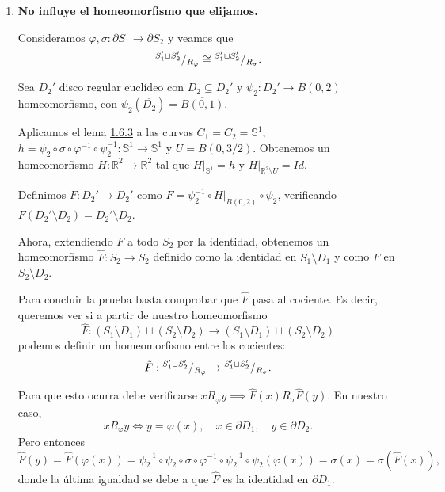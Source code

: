 {\begin{enumerate}
        Sea ahora $\varepsilon > 0 $ suficientemente pequeño de forma que $\overline{F(D_4)} \subseteq D_1$, donde $D_4 = \psi^{-1}(B(0, \varepsilon))$. Como $\overline{D_4} \subseteq D_3$, por el paso 1) obtenemos $S_1 \setminus D_4 \cong S_1 \setminus D_3$, y de la misma forma $S_1 \setminus F(D_4) \cong S_1 \setminus D_1$.

        Pero como $F$ es un homeomorfismo, $S_1 \setminus F(D_4) \cong S_1 \setminus D_4$, concluyendo así el paso 2.

        \item \textbf{No influye el homeomorfismo que elijamos.}

        Consideramos $\varphi,\sigma:\partial S_1\to\partial S_2$ y veamos que
        \[
        {^{S_1'\sqcup S_2'}}/{_{R_\varphi}}\cong{^{S_1'\sqcup S_2'}}/{_{R_\sigma}}.
        \]

        Sea $D_2'$ disco regular euclídeo con $\overline{D_2}\subseteq D_2'$ y $\psi_2 : D_2' \to B(0,2)$ homeomorfismo, con $\psi_2(\overline{D_2}) = \overline{B(0,1)}$. 

        Aplicamos el lema \hyperref[lem:extension-homeo]{1.6.3} a las curvas $C_1 = C_2 = \mathbb{S}^1$, $h = \psi_2 \circ \sigma \circ \varphi^{-1} \circ \psi_2^{-1} : \mathbb{S}^1\to \mathbb{S}^1$ y $U = B(0,3/2)$. Obtenemos un homeomorfismo $H : \mathbb{R}^2 \to \mathbb{R}^2$ tal que $H\vert_{\mathbb{S}^1} = h$ y $H\vert_{\mathbb{R}^2\setminus U} = Id$. 

        Definimos $F:D_2' \to D_2'$ como $F = \psi_2^{-1} \circ H \vert_{B(0,2)} \circ \psi_2$, verificando $F(D_2'\setminus D_2) = D_2'\setminus D_2$. 

        Ahora, extendiendo $F$ a todo $S_2$ por la identidad, obtenemos un homeomorfismo $\hat{F} : S_2 \to S_2$ definido como la identidad en $S_1 \setminus D_1$ y como $F$ en $ S_2 \setminus D_2$.

        Para concluir la prueba basta comprobar que $\hat{F}$ pasa al cociente. Es decir, queremos ver si a partir de nuestro homeomorfismo 
        \[
        \hat{F} : (S_1\setminus D_1)\sqcup(S_2\setminus D_2) \to (S_1\setminus D_1)\sqcup(S_2\setminus D_2)
        \]
        podemos definir un homeomorfismo entre los cocientes:  
        \[
        \tilde{F} : {^{S_1'\sqcup S_2'}}/{_{R_\varphi}} \to {^{S_1'\sqcup S_2'}}/{_{R_\sigma}}.
        \]

        Para que esto ocurra debe verificarse $xR_\varphi y \implies \hat{F}(x) R_\sigma \hat{F}(y)$. En nuestro caso,  
        \[
        xR_\varphi y \iff y = \varphi(x), \quad x\in \partial D_1, \quad y\in \partial D_2. 
        \]
        Pero entonces
        \[
        \hat{F}(y) = \hat{F}(\varphi(x)) = \psi_2^{-1} \circ \psi_2 \circ \sigma \circ \varphi^{-1} \circ \psi_2^{-1} \circ \psi_2(\varphi(x))
        = \sigma(x) = \sigma(\hat{F}(x)),
        \]
        donde la última igualdad se debe a que $\hat{F}$ es la identidad en $\partial D_1$. 


\end{enumerate}}
